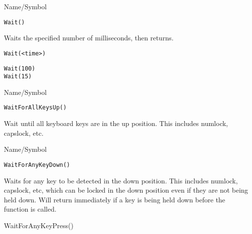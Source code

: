\begin{desc}{Name/Symbol}
\item[Name/Symbol]  	\verb+Wait()+ 

\item[Description] 	Waits the specified number of milliseconds, then returns. 

\item[Usage]
\begin{verbatim}
Wait(<time>)
\end{verbatim}

\item[Example]
\begin{verbatim}
Wait(100)
Wait(15)
\end{verbatim}

\item[See Also]	
\end{desc}

\rl


\begin{desc}{Name/Symbol}
\item[Name/Symbol]  	\verb+WaitForAllKeysUp()+

\item[Description]	
               Wait until all keyboard keys are in the up
               position. This includes numlock, capslock, etc.
\item[Usage]		

\item[Example]	

\item[See Also]	

\end{desc}

\rl


\begin{desc}{Name/Symbol}
\item[Name/Symbol]  	\verb+WaitForAnyKeyDown()+

\item[Description]	
             Waits for any key to be detected in the down position.
             This includes numlock, capslock, etc, which can be locked
             in the down position even if they are not being held
             down.  Will return immediately if a key is being held
             down before the function is called. 

\item[Usage]		

\item[Example]	

\item[See Also]	
            WaitForAnyKeyPress()
\end{desc}

